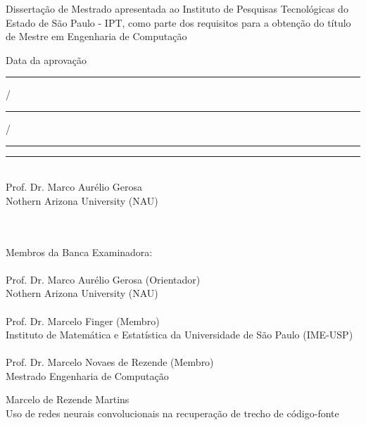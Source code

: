 \documentclass[12pt,twoside,a4paper]{book} %
\begin{document}
    \vskip 2cm

    \hspace{6cm}\begin{minipage}{0.48\linewidth}
	Dissertação de Mestrado apresentada
	ao Instituto de Pesquisas Tecnológicas do\\
	Estado de São Paulo - IPT, como 
	parte dos requisitos para a obtenção do 
	título de Mestre em Engenharia de 
	Computação
    \end{minipage}
    
    \vskip 2cm
    
    \hspace{6cm}\begin{minipage}{0.48\linewidth}
	Data da aprovação \rule{0.7cm}{0.4pt}/\rule{0.7cm}{0.4pt}/\rule{1.4cm}{0.4pt}
    \end{minipage}
    
    \vskip 2cm
    
    \hspace{6cm}\begin{minipage}{0.48\linewidth}
	\rule{7cm}{0.4pt}\\
	Prof. Dr. Marco Aurélio Gerosa\\
	Nothern Arizona University (NAU)\\
    \end{minipage}
\\
\\
Membros da Banca Examinadora:\\ 
\\
Prof. Dr. Marco Aurélio Gerosa (Orientador)\\
Nothern Arizona University (NAU)\\
\\
Prof. Dr. Marcelo Finger (Membro)\\
Instituto de Matemática e Estatística da Universidade de São Paulo (IME-USP)\\
\\
Prof. Dr. Marcelo Novaes de Rezende (Membro)\\
Mestrado Engenharia de Computação\\


\pagebreak


%
%
%
%
\newpage
\thispagestyle{empty}
    \begin{center}
        Marcelo de Rezende Martins\\
        \vspace*{2.3 cm}
        Uso de redes neurais convolucionais na recuperação de trecho de código-fonte\\
        \vspace*{2 cm}
    \end{center}
\end{document}
